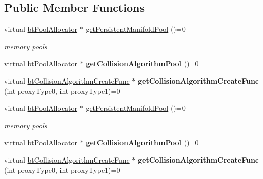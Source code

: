 \subsection*{Public Member Functions}
\begin{DoxyCompactItemize}
\item 
\mbox{\label{classbtCollisionConfiguration_a0885a7c5ff597994cade5b1a495edfa2}} 
virtual \hyperlink{classbtPoolAllocator}{bt\+Pool\+Allocator} $\ast$ \hyperlink{classbtCollisionConfiguration_a0885a7c5ff597994cade5b1a495edfa2}{get\+Persistent\+Manifold\+Pool} ()=0
\begin{DoxyCompactList}\small\item\em memory pools \end{DoxyCompactList}\item 
\mbox{\label{classbtCollisionConfiguration_ad518b5518f3146593f6ea005e9514f09}} 
virtual \hyperlink{classbtPoolAllocator}{bt\+Pool\+Allocator} $\ast$ {\bfseries get\+Collision\+Algorithm\+Pool} ()=0
\item 
\mbox{\label{classbtCollisionConfiguration_acb52a540206ad48d7748b7f2e06bf94e}} 
virtual \hyperlink{structbtCollisionAlgorithmCreateFunc}{bt\+Collision\+Algorithm\+Create\+Func} $\ast$ {\bfseries get\+Collision\+Algorithm\+Create\+Func} (int proxy\+Type0, int proxy\+Type1)=0
\item 
\mbox{\label{classbtCollisionConfiguration_a0885a7c5ff597994cade5b1a495edfa2}} 
virtual \hyperlink{classbtPoolAllocator}{bt\+Pool\+Allocator} $\ast$ \hyperlink{classbtCollisionConfiguration_a0885a7c5ff597994cade5b1a495edfa2}{get\+Persistent\+Manifold\+Pool} ()=0
\begin{DoxyCompactList}\small\item\em memory pools \end{DoxyCompactList}\item 
\mbox{\label{classbtCollisionConfiguration_ad518b5518f3146593f6ea005e9514f09}} 
virtual \hyperlink{classbtPoolAllocator}{bt\+Pool\+Allocator} $\ast$ {\bfseries get\+Collision\+Algorithm\+Pool} ()=0
\item 
\mbox{\label{classbtCollisionConfiguration_acb52a540206ad48d7748b7f2e06bf94e}} 
virtual \hyperlink{structbtCollisionAlgorithmCreateFunc}{bt\+Collision\+Algorithm\+Create\+Func} $\ast$ {\bfseries get\+Collision\+Algorithm\+Create\+Func} (int proxy\+Type0, int proxy\+Type1)=0
\end{DoxyCompactItemize}


